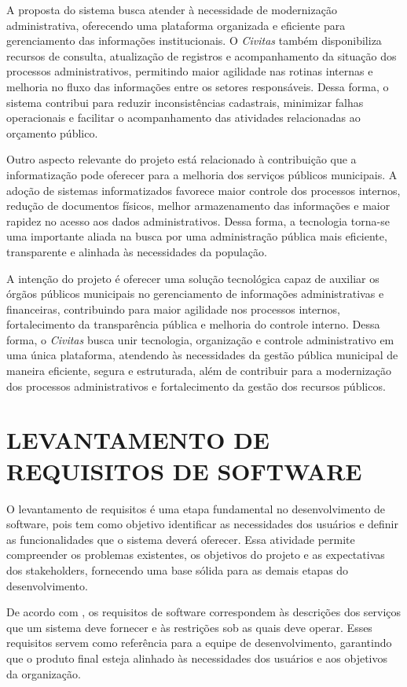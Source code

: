 A proposta do sistema busca atender à necessidade de modernização administrativa, oferecendo uma plataforma organizada e eficiente para gerenciamento das informações institucionais. O \textit{Civitas} também disponibiliza recursos de consulta, atualização de registros e acompanhamento da situação dos processos administrativos, permitindo maior agilidade nas rotinas internas e melhoria no fluxo das informações entre os setores responsáveis. Dessa forma, o sistema contribui para reduzir inconsistências cadastrais, minimizar falhas operacionais e facilitar o acompanhamento das atividades relacionadas ao orçamento público.

Outro aspecto relevante do projeto está relacionado à contribuição que a informatização pode oferecer para a melhoria dos serviços públicos municipais. A adoção de sistemas informatizados favorece maior controle dos processos internos, redução de documentos físicos, melhor armazenamento das informações e maior rapidez no acesso aos dados administrativos. Dessa forma, a tecnologia torna-se uma importante aliada na busca por uma administração pública mais eficiente, transparente e alinhada às necessidades da população.

A intenção do projeto é oferecer uma solução tecnológica capaz de auxiliar os órgãos públicos municipais no gerenciamento de informações administrativas e financeiras, contribuindo para maior agilidade nos processos internos, fortalecimento da transparência pública e melhoria do controle interno. Dessa forma, o \textit{Civitas} busca unir tecnologia, organização e controle administrativo em uma única plataforma, atendendo às necessidades da gestão pública municipal de maneira eficiente, segura e estruturada, além de contribuir para a modernização dos processos administrativos e fortalecimento da gestão dos recursos públicos.

\chapter{LEVANTAMENTO DE REQUISITOS DE SOFTWARE}

O levantamento de requisitos é uma etapa fundamental no desenvolvimento de software, pois tem como objetivo identificar as necessidades dos usuários e definir as funcionalidades que o sistema deverá oferecer. Essa atividade permite compreender os problemas existentes, os objetivos do projeto e as expectativas dos stakeholders, fornecendo uma base sólida para as demais etapas do desenvolvimento.

De acordo com \textcite{Sommerville2018ES10}, os requisitos de software correspondem às descrições dos serviços que um sistema deve fornecer e às restrições sob as quais deve operar. Esses requisitos servem como referência para a equipe de desenvolvimento, garantindo que o produto final esteja alinhado às necessidades dos usuários e aos objetivos da organização.

